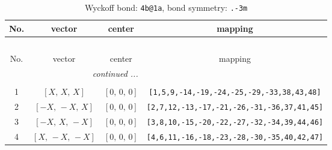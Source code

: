 \documentclass[fleqn,8pt]{jsarticle}
\begin{document}
\begin{longtable}{cccc}
\caption{Wyckoff bond: {\tt 4b@1a}, bond symmetry: {\tt .-3m}}
 \\
 \hline \hline
No. & vector & center & mapping \\ \hline \endfirsthead

\multicolumn{3}{l}{\tablename\ \thetable{}} \\
 \hline \hline
No. & vector & center & mapping \\ \hline \endhead

 \hline \hline
\multicolumn{3}{r}{\footnotesize\it continued ...} \\ \endfoot

 \hline \hline
\multicolumn{3}{r}{} \\ \endlastfoot

1 & $\left[ X,\, X,\, X \right]$ & $\left[ 0,\, 0,\, 0 \right]$ & {\tt [1,5,9,-14,-19,-24,-25,-29,-33,38,43,48]} \\ \hline
2 & $\left[ - X,\, - X,\, X \right]$ & $\left[ 0,\, 0,\, 0 \right]$ & {\tt [2,7,12,-13,-17,-21,-26,-31,-36,37,41,45]} \\ \hline
3 & $\left[ - X,\, X,\, - X \right]$ & $\left[ 0,\, 0,\, 0 \right]$ & {\tt [3,8,10,-15,-20,-22,-27,-32,-34,39,44,46]} \\ \hline
4 & $\left[ X,\, - X,\, - X \right]$ & $\left[ 0,\, 0,\, 0 \right]$ & {\tt [4,6,11,-16,-18,-23,-28,-30,-35,40,42,47]} \\
\end{longtable}
\renewcommand{\arraystretch}{1.2}
\end{document}
